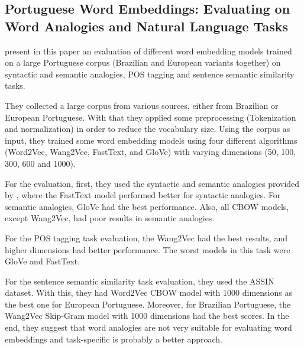 \subsection{Portuguese Word Embeddings: Evaluating on Word Analogies and Natural
Language Tasks}

 present in this paper an evaluation of different word embedding models trained on a large Portuguese corpus (Brazilian and European variants together) on syntactic and semantic analogies, POS tagging and sentence semantic similarity tasks.

They collected a large corpus from various sources, either from Brazilian or European Portuguese. With that they applied some preprocessing (Tokenization and normalization) in order to reduce the vocabulary size. Using the corpus as input, they trained some word embedding models using four different algorithms (Word2Vec, Wang2Vec, FastText, and GloVe) with varying dimensions (50, 100, 300, 600 and 1000).

For the evaluation, first, they used the syntactic and semantic analogies provided by , where the FastText model performed better for syntactic analogies. For semantic analogies, GloVe had the best performance. Also, all CBOW models, except Wang2Vec, had poor results in semantic analogies.

For the POS tagging task evaluation, the Wang2Vec had the best results, and higher dimensions had better performance. The worst models in this task were GloVe and FastText. 

For the sentence semantic similarity task evaluation, they used the ASSIN dataset. With this, they had Word2Vec CBOW model with 1000 dimensions as the best one for European Portuguese. Moreover, for Brazilian Portuguese, the Wang2Vec Skip-Gram model with 1000 dimensions had the best scores.
In the end, they suggest that word analogies are not very suitable for evaluating word embeddings and task-specific is probably a better approach.








